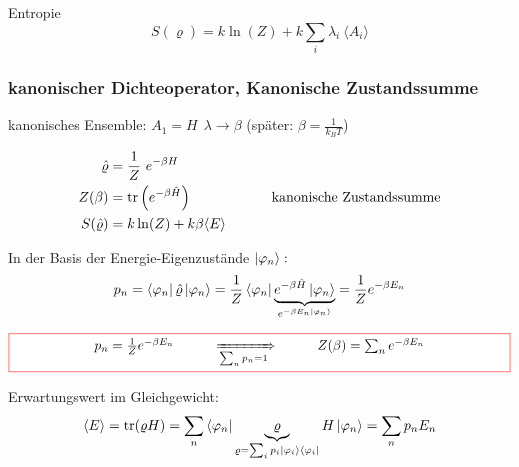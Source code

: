  \begin{definition}{Entropie}
     \begin{equation}
         S(\varrho) =k \ln (Z) + k \sum_i \lambda_i \ \langle A_i\rangle
     \end{equation}
 \end{definition}

\subsubsection{kanonischer Dichteoperator, Kanonische Zustandssumme}

kanonisches Ensemble: \hspace{2cm} $A_1 = H \ \ \lambda\rightarrow\beta$ \hspace{2cm} (später: $\beta=\frac{1}{k_BT}$)


\begin{align}
    \hat{\varrho} &= \frac{1}{Z} \ e^{-\beta H} \\
    Z(\beta)&= \trace \left( e^{-\beta \hat{H}} \right) \hspace{2cm} \text{kanonische Zustandssumme} \\
    S(\hat{\varrho}) &= k \ln (Z) + k \beta \langle E \rangle 
\end{align}

In der Basis der Energie-Eigenzustände $\ket{\varphi_n}:$
\begin{equation}
    p_n = \bra{\varphi_n}\hat{\varrho} \ket{\varphi_n} = \frac{1}{Z} \bra{\varphi_n} \underbrace{e^{-\beta \hat{H}}\ket{\varphi_n}}_{e^{-\beta E_n \ket{\varphi_n}}} = \frac{1}{Z} e^{-\beta E_n}
\end{equation}

\begin{equation}
    \fcolorbox{red}{white}{\hspace{2cm} $p_n = \frac{1}{Z} e^{-\beta E_n} \hspace{1cm} \xRightarrow[\sum_n p_n =1]{} \hspace{1cm} Z(\beta) = \sum_n e^{-\beta E_n}$ \hspace{2cm}}
\end{equation}

Erwartungswert im Gleichgewicht:
\begin{equation}
    \langle E\rangle = \trace (\varrho H ) = \sum_n \bra{\varphi_n} \underbrace{\varrho}_{\varrho= \sum_i p_i \ket{\varphi_i}\bra{\varphi_i}}H\ket{\varphi_n} =\sum_n p_n E_n
\end{equation}

